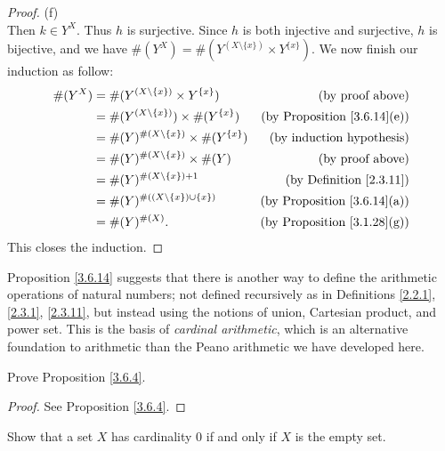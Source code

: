 \begin{proof}{(f)}
\[    \]
    Then \(k \in Y^X\).
    Thus \(h\) is surjective.
    Since \(h\) is both injective and surjective, \(h\) is bijective, and we have \(\#(Y^X) = \#(Y^{(X \setminus \{x\})} \times Y^{\{x\}})\).
    We now finish our induction as follow:
    \begin{align*}
        \#(Y^X) & = \#(Y^{(X \setminus \{x\})} \times Y^{\{x\}})       & \text{(by proof above)}                 \\
                & = \#(Y^{(X \setminus \{x\})}) \times \#(Y^{\{x\}})   & \text{(by Proposition \ref{3.6.14}(e))} \\
                & = \#(Y)^{\#(X \setminus \{x\})} \times \#(Y^{\{x\}}) & \text{(by induction hypothesis)}        \\
                & = \#(Y)^{\#(X \setminus \{x\})} \times \#(Y)         & \text{(by proof above)}                 \\
                & = \#(Y)^{\#(X \setminus \{x\}) + 1}                  & \text{(by Definition \ref{2.3.11})}     \\
                & = \#(Y)^{\#((X \setminus \{x\}) \cup \{x\})}         & \text{(by Proposition \ref{3.6.14}(a))} \\
                & = \#(Y)^{\#(X)}.                                     & \text{(by Proposition \ref{3.1.28}(g))}
    \end{align*}
    This closes the induction.
\end{proof}

\begin{remark}\label{3.6.15}
    Proposition \ref{3.6.14} suggests that there is another way to define the arithmetic operations of natural numbers;
    not defined recursively as in Definitions \ref{2.2.1}, \ref{2.3.1}, \ref{2.3.11}, but instead using the notions of union, Cartesian product, and power set.
    This is the basis of \emph{cardinal arithmetic}, which is an alternative foundation to arithmetic than the Peano arithmetic we have developed here.
\end{remark}

\exercisesection

\begin{exercise}\label{ex 3.6.1}
    Prove Proposition \ref{3.6.4}.
\end{exercise}

\begin{proof}
    See Proposition \ref{3.6.4}.
\end{proof}

\begin{exercise}\label{ex 3.6.2}
    Show that a set \(X\) has cardinality \(0\) if and only if \(X\) is the empty set.
\end{exercise}

